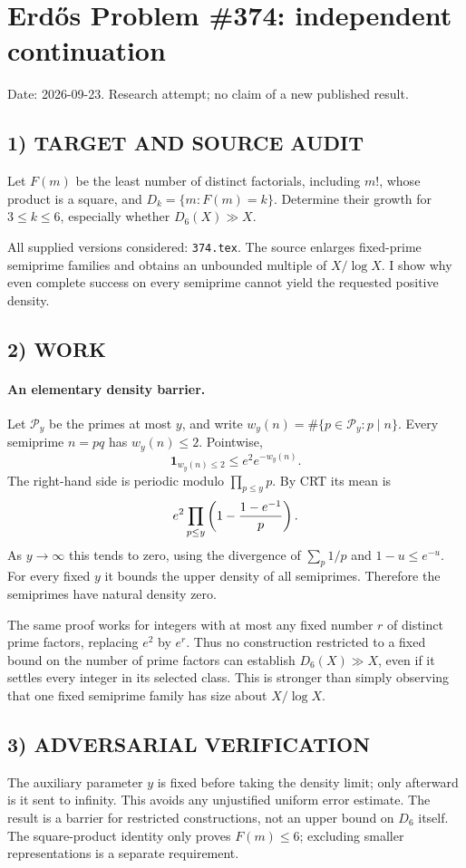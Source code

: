 \section{Erd\H{o}s Problem \#374: independent continuation}
\noindent Date: 2026-09-23. Research attempt; no claim of a new published result.
\subsection{1) TARGET AND SOURCE AUDIT}
Let $F(m)$ be the least number of distinct factorials, including $m!$, whose product is a square, and $D_k=\{m:F(m)=k\}$. Determine their growth for $3\le k\le6$, especially whether $D_6(X)\gg X$.

All supplied versions considered: \texttt{374.tex}.
The source enlarges fixed-prime semiprime families and obtains an unbounded multiple of $X/\log X$. I show why even complete success on every semiprime cannot yield the requested positive density.
\subsection{2) WORK}
\paragraph{An elementary density barrier.}
Let $\mathcal P_y$ be the primes at most $y$, and write $w_y(n)=\#\{p\in\mathcal P_y:p\mid n\}$. Every semiprime $n=pq$ has $w_y(n)\le2$. Pointwise,
\[
\mathbf1_{w_y(n)\le2}\le e^2e^{-w_y(n)}.
\]
The right-hand side is periodic modulo $\prod_{p\le y}p$. By CRT its mean is
\[
e^2\prod_{p\le y}\left(1-{1-e^{-1}\over p}\right).
\]
As $y\to\infty$ this tends to zero, using the divergence of $\sum_p1/p$ and $1-u\le e^{-u}$. For every fixed $y$ it bounds the upper density of all semiprimes. Therefore the semiprimes have natural density zero.

The same proof works for integers with at most any fixed number $r$ of distinct prime factors, replacing $e^2$ by $e^r$. Thus no construction restricted to a fixed bound on the number of prime factors can establish $D_6(X)\gg X$, even if it settles every integer in its selected class. This is stronger than simply observing that one fixed semiprime family has size about $X/\log X$.
\subsection{3) ADVERSARIAL VERIFICATION}
The auxiliary parameter $y$ is fixed before taking the density limit; only afterward is it sent to infinity. This avoids any unjustified uniform error estimate. The result is a barrier for restricted constructions, not an upper bound on $D_6$ itself. The square-product identity only proves $F(m)\le6$; excluding smaller representations is a separate requirement.
